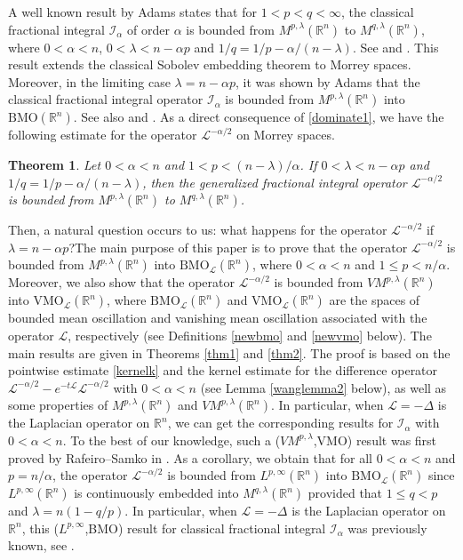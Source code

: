 \documentclass[10pt, reqno]{amsart}
\newtheorem{theorem}{Theorem}[section]
\theoremstyle{definition}
\theoremstyle{remark}
\numberwithin{equation}{section}
\begin{document}
A well known result by Adams states that for $1<p<q<\infty$, the classical fractional integral $\mathcal{I}_{\alpha}$ of order $\alpha$ is bounded from $M^{p,\lambda}(\mathbb R^n)$ to $M^{q,\lambda}(\mathbb R^n)$, where $0<\alpha<n$, $0<\lambda<n-\alpha p$ and $1/q=1/p-\alpha/{(n-\lambda)}$. See \cite{adams} and \cite{adams1}. This result extends the classical Sobolev embedding theorem to Morrey spaces. Moreover, in the limiting case $\lambda=n-\alpha p$, it was shown by Adams that the classical fractional integral operator $\mathcal{I}_{\alpha}$ is bounded from $M^{p,\lambda}(\mathbb R^n)$ into $\mathrm{BMO}(\mathbb R^n)$. See also \cite{adams} and \cite{adams1}. As a direct consequence of \eqref{dominate1}, we have the following estimate for the operator $\mathcal{L}^{-\alpha/2}$ on Morrey spaces.
\begin{theorem}
Let $0<\alpha<n$ and $1<p<{(n-\lambda)}/\alpha$. If $0<\lambda<n-\alpha p$ and $1/q=1/p-\alpha/{(n-\lambda)}$, then the generalized fractional integral operator $\mathcal L^{-\alpha/2}$ is bounded from $M^{p,\lambda}(\mathbb R^n)$ to $M^{q,\lambda}(\mathbb R^n)$.
\end{theorem}
Then, a natural question occurs to us: what happens for the operator $\mathcal{L}^{-\alpha/2}$ if $\lambda=n-\alpha p$?The main purpose of this paper is to prove that the operator $\mathcal{L}^{-\alpha/2}$ is bounded from ${M}^{p,\lambda}(\mathbb R^n)$ into $\mathrm{BMO}_{\mathcal{L}}(\mathbb R^n)$, where $0<\alpha<n$ and $1\leq p<n/{\alpha}$. Moreover, we also show that the operator $\mathcal{L}^{-\alpha/2}$ is bounded from $V{M}^{p,\lambda}(\mathbb R^n)$ into $\mathrm{VMO}_{\mathcal{L}}(\mathbb R^n)$, where $\mathrm{BMO}_{\mathcal{L}}(\mathbb R^n)$ and $\mathrm{VMO}_{\mathcal{L}}(\mathbb R^n)$ are the spaces of bounded mean oscillation and vanishing mean oscillation associated with the operator $\mathcal{L}$, respectively (see Definitions \ref{newbmo} and \ref{newvmo} below). The main results are given in Theorems \ref{thm1} and \ref{thm2}. The proof is based on the pointwise estimate \eqref{kernelk} and the kernel estimate for the
difference operator $\mathcal{L}^{-\alpha/2}-e^{-t\mathcal L}\mathcal{L}^{-\alpha/2}$ with $0<\alpha<n$ (see Lemma \ref{wanglemma2} below), as well as some properties of ${M}^{p,\lambda}(\mathbb R^n)$ and $V{M}^{p,\lambda}(\mathbb R^n)$. In particular, when $\mathcal{L}=-\Delta$ is the Laplacian operator on $\mathbb R^n$, we can get the corresponding results for $\mathcal{I}_{\alpha}$ with $0<\alpha<n$. To the best of our knowledge, such a ($V{M}^{p,\lambda}$,VMO) result was first proved by Rafeiro--Samko in \cite[Theorem 4]{Rafeiro}. As a corollary, we obtain that for all $0<\alpha<n$ and $p=n/{\alpha}$, the operator $\mathcal{L}^{-\alpha/2}$ is bounded from $L^{p,\infty}(\mathbb R^n)$ into $\mathrm{BMO}_{\mathcal{L}}(\mathbb R^n)$ since $L^{p,\infty}(\mathbb R^n)$ is continuously embedded into ${M}^{q,\lambda}(\mathbb R^n)$ provided that $1\leq q<p$ and $\lambda=n(1-q/p)$. In particular, when $\mathcal{L}=-\Delta$ is the Laplacian operator on $\mathbb R^n$, this ($L^{p,\infty}$,BMO) result for classical fractional integral $\mathcal{I}_{\alpha}$ was previously known, see \cite[p.164]{stein}.
\end{document}
